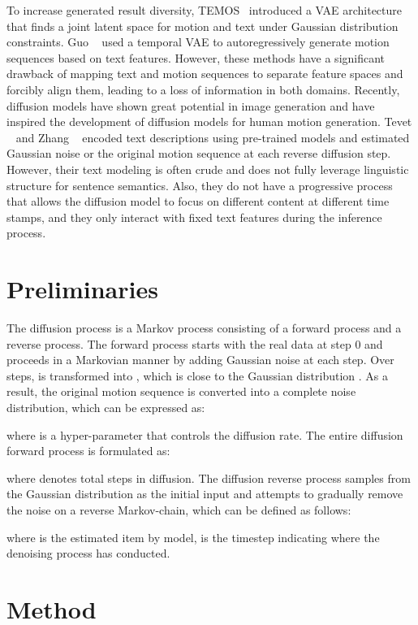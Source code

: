 \documentclass[10pt,twocolumn,letterpaper]{article}
\begin{document}
To increase generated result diversity, TEMOS~\cite{petrovich2022temos} introduced a VAE architecture that finds a joint latent space for motion and text under Gaussian distribution constraints. Guo \etal~\cite{guo2022generating} used a temporal VAE to autoregressively generate motion sequences based on text features. However, these methods have a significant drawback of mapping text and motion sequences to separate feature spaces and forcibly align them, leading to a loss of information in both domains. Recently, diffusion models have shown great potential in image generation and have inspired the development of diffusion models for human motion generation. Tevet \etal~\cite{tevet2022human} and Zhang \etal~\cite{zhang2022motiondiffuse} encoded text descriptions using pre-trained models and estimated Gaussian noise or the original motion sequence at each reverse diffusion step. However, their text modeling is often crude and does not fully leverage linguistic structure for sentence semantics. Also, they do not have a progressive process that allows the diffusion model to focus on different content at different time stamps, and they only interact with fixed text features during the inference process.

\section{Preliminaries}

The diffusion process is a Markov process consisting of a forward process and a reverse process.
The forward process starts with the real data  at step 0 and proceeds in a Markovian manner by adding Gaussian noise at each step. Over  steps,  is transformed into , which is close to the Gaussian distribution . As a result, the original motion sequence is converted into a complete noise distribution, which can be expressed as:

where  is a hyper-parameter that controls the diffusion rate. The entire diffusion forward process is formulated as:

where  denotes total steps in diffusion. The diffusion reverse process samples from the Gaussian distribution  as the initial input and attempts to gradually remove the noise on a reverse Markov-chain, which  can be defined as follows:


where  is the estimated item by model,  is the timestep indicating where the denoising process has conducted.
\section{Method}
\end{document}
